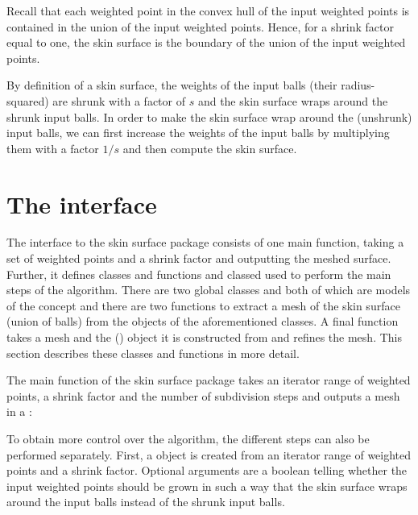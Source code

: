 Recall that each weighted point in the convex hull of the input
weighted points is contained in the union of the input weighted
points. Hence, for a shrink factor equal to one, the skin surface is
the boundary of the union of the input weighted points.

By definition of a skin surface, the weights of the input balls (their
radius-squared) are shrunk with a factor of $s$ and the skin surface
wraps around the shrunk input balls. In order to make the skin surface
wrap around the (unshrunk) input balls, we can first increase the
weights of the input balls by multiplying them with a factor $1/s$ and
then compute the skin surface.

\section{The interface}
\ccThreeToTwo

The interface to the skin surface package consists of one main
function, taking a set of weighted points and a shrink factor and
outputting the meshed surface. Further, it defines classes and
functions and classed used to perform the main steps of the algorithm.
There are two global classes  and
 both of which are models of the concept
 and there are two functions to extract a mesh of
the skin surface (union of balls) from the objects of the
aforementioned classes. A final function takes a mesh and the
 () object it is constructed
from and refines the mesh. This section describes these classes and
functions in more detail.

The main function of the skin surface package takes an iterator range
of weighted points, a shrink factor and the number of subdivision
steps and outputs a mesh in a :


To obtain more control over the algorithm, the different steps can
also be performed separately. First, a  object is
created from an iterator range of weighted points and a shrink factor.
Optional arguments are a boolean telling whether the input weighted
points should be grown in such a way that the skin surface wraps
around the input balls instead of the shrunk input balls.

